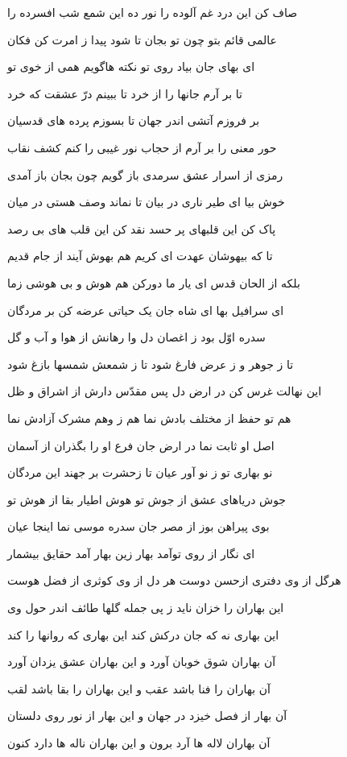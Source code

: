 صاف کن اين درد غم آلوده را
نور ده اين شمع شب افسرده را

عالمى قائم بتو چون تو بجان
تا شود پيدا ز امرت کن فکان

اى بهاى جان بياد روى تو
نکته هاگويم همى از خوى تو

تا بر آرم جانها را از خرد
تا ببينم درّ عشقت که خرد

بر فروزم آتشى اندر جهان
تا بسوزم پرده هاى قدسيان

حور معنى را بر آرم از حجاب
نور غيبى را کنم کشف نقاب

رمزى از اسرار عشق سرمدى
باز گويم چون بجان باز آمدى

خوش بيا اى طير نارى در بيان
تا نماند وصف هستى در ميان

پاک کن اين قلبهاى پر حسد
نقد کن اين قلب هاى بى رصد

تا که بيهوشان عهدت اى کريم
هم بهوش آيند از جام قديم

بلکه از الحان قدس اى يار ما
دورکن هم هوش و بى هوشى زما

اى سرافيل بها اى شاه جان
يک حياتى عرضه کن بر مردگان

سدره اوّل بود ز اغصان دل
وا رهانش از هوا و آب و گل

تا ز جوهر و ز عرض فارغ شود
تا ز شمعش شمسها بازغ شود

اين نهالت غرس کن در ارض دل
پس مقدّس دارش از اشراق و ظل

هم تو حفظ از مختلف بادش نما
هم ز وهم مشرک آزادش نما

اصل او ثابت نما در ارض جان
فرع او را بگذران از آسمان

نو بهارى تو ز نو آور عيان
تا زحشرت بر جهند اين مردگان

جوش درياهاى عشق از جوش تو
هوش اطيار بقا از هوش تو

بوى پيراهن بوز از مصر جان
سدره موسى نما اينجا عيان

اى نگار از روى توآمد بهار
زين بهار آمد حقايق بيشمار

هرگل از وى دفترى ازحسن دوست
هر دل از وى کوثرى از فضل هوست

اين بهاران را خزان نايد ز پى
جمله گلها طائف اندر حول وى

اين بهارى نه که جان‌ درکش کند
اين بهارى که روانها را کند

آن بهاران شوق خوبان آورد
و اين بهاران عشق يزدان آورد

آن بهاران را فنا باشد عقب
و اين بهاران را بقا باشد لقب

آن بهار از فصل خيزد در جهان
و اين بهار از نور روى دلستان

آن بهاران لاله ها آرد برون
و اين بهاران ناله ها دارد کنون

